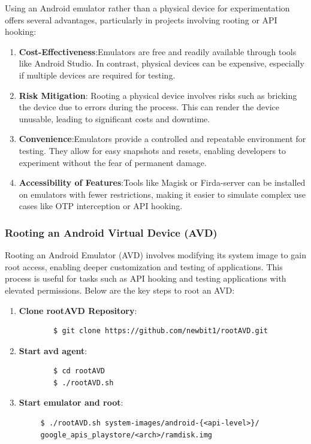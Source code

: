 \documentclass[a4paper,12pt]{article}
\begin{document}
Using an Android emulator rather than a physical device for experimentation offers several advantages, particularly in projects involving rooting or API hooking:

\begin{enumerate}
    \item \textbf{Cost-Effectiveness}:Emulators are free and readily available through tools like Android Studio. In contrast, physical devices can be expensive, especially if multiple devices are required for testing.
    \item \textbf{Risk Mitigation}: Rooting a physical device involves risks such as bricking the device due to errors during the process. This can render the device unusable, leading to significant costs and downtime.
    \item \textbf{Convenience}:Emulators provide a controlled and repeatable environment for testing. They allow for easy snapshots and resets, enabling developers to experiment without the fear of permanent damage.
    \item \textbf{Accessibility of Features}:Tools like Magisk or Firda-server can be installed on emulators with fewer restrictions, making it easier to simulate complex use cases like OTP interception or API hooking.
\end{enumerate}

\subsubsection{Rooting an Android Virtual Device (AVD)}
Rooting an Android Emulator (AVD) involves modifying its system image to gain root access, enabling deeper customization and testing of applications. This process is useful for tasks such as API hooking and testing applications with elevated permissions. Below are the key steps to root an AVD:

\begin{enumerate}
    \item \textbf{Clone rootAVD Repository}:
    \begin{verbatim}
        $ git clone https://github.com/newbit1/rootAVD.git
    \end{verbatim}

    \item \textbf{Start avd agent}:
    \begin{verbatim}
        $ cd rootAVD
        $ ./rootAVD.sh
    \end{verbatim}

    \item \textbf{Start emulator and root}:
    \begin{verbatim}
     $ ./rootAVD.sh system-images/android-{<api-level>}/
     google_apis_playstore/<arch>/ramdisk.img
    \end{verbatim}

\end{enumerate}
\end{document}
